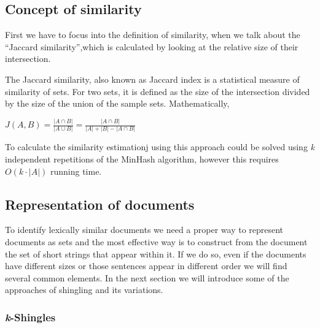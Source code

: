 \documentclass[12pt]{article}
\begin{document}
\subsection{Concept of similarity}
First we have to focus into the definition of similarity, when we talk about the ``Jaccard similarity'',which is calculated by looking at the relative size of their intersection. 

The Jaccard similarity, also known as Jaccard index is a statistical measure of similarity of sets. For two sets, it is defined as the size of the intersection divided by the size of the union of the sample sets. Mathematically,
\bigbreak
\centerline{\large $J(A,B)=\frac{\left |A\cap B  \right |}{ \left |A\cup B  \right |} = \frac{\left |A\cap B  \right |}{ \left|A\right|+\left|B\right|-\left |A\cap B  \right |} $}
\bigbreak

To calculate the similarity estimationj using this approach could be solved using \textit{k} independent repetitions of the MinHash algorithm, however this requires $O(k \cdot |A|)$ running time. 


\subsection{Representation of documents}

To identify lexically similar documents we need a proper way to represent documents as sets and the most effective way is to construct from the document the set of short strings that appear within it. If we do so, even if the documents have different sizes or those sentences appear in different order we will find several common elements. In the next section we will introduce some of the approaches of shingling and its variations.

\subsubsection{\textit{k}-Shingles}
\end{document}
